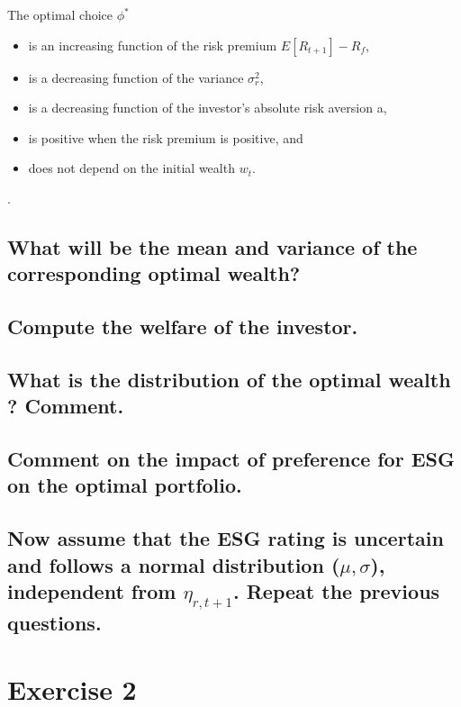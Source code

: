 \documentclass[]{article}
\begin{document}
The optimal choice $\phi^*$ 
\begin{itemize}
	\item is an increasing function of the risk premium $E[R_{t+1}]-R_f$,
	\item is a decreasing function of the variance $\sigma_r^2$,
	\item is a decreasing function of the investor’s absolute risk aversion a,
	\item is positive when the risk premium is positive, and
	\item does not depend on the initial wealth $w_t$.
\end{itemize}.

\subsection{What will be the mean and variance of the corresponding optimal wealth?}
\subsection{Compute the welfare of the investor.}
\subsection{What is the distribution of the optimal wealth ? Comment.}
\subsection{Comment on the impact of preference for ESG on the optimal portfolio.}
\subsection{Now assume that the ESG rating is uncertain and follows a normal distribution ($\mu, \sigma$), independent from $\eta_{r,t+1}$. Repeat the previous questions.}

\section{Exercise 2}
\end{document}
